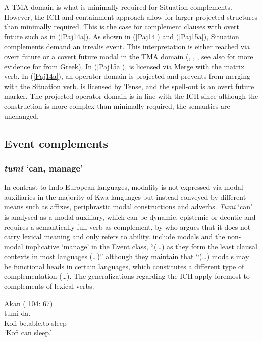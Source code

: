 \documentclass[output=paper]{langscibook}
\begin{document}
A TMA domain is what is minimally required for Situation complements. However, the ICH and containment approach allow for larger projected structures than minimally required. This is the case for complement clauses with overt future such as in (\ref{Paj14a}). As shown in (\ref{Paj14}) and (\ref{Paj15a}), Situation complements demand an irrealis event. This interpretation is either reached via overt future or a covert future modal  in the TMA domain (\citealt{todorovickwurmbrand2020}, \citealt{wurmbrand2014a}, \citealt{todorovic2015}, see also \citet{wurmbrandlohninger2020} for more evidence for  from Greek). In (\ref{Paj15a}),  is licensed via Merge with the matrix verb. In (\ref{Paj14a}), an operator domain is projected and prevents  from merging with the Situation verb.  is licensed by Tense, and the spell-out is an overt future marker. The projected operator domain is in line with the ICH since although the construction is more complex than minimally required, the semantics are unchanged.  

\subsection{Event complements}\label{Pajsect:3.3}

\subsubsection{\textit{tumi} `can, manage'}

In contrast to Indo-European languages, modality is not expressed via modal auxiliaries in the majority of Kwa languages but instead conveyed by different means such as affixes, periphrastic modal constructions and adverbs. \emph{Tumi} ‘can’ is analysed as a modal auxiliary, which can be dynamic, epistemic or deontic and requires a semantically full verb as complement, by \citet{owusu2014} who argues that it does not carry lexical meaning and only refers to ability. \citet{wurmbrandlohninger2020} include modals and the non-modal implicative ‘manage’ in the Event class, “(…) as they form the least clausal contexts in most languages (…)” although they maintain that “(…) modals may be functional heads in certain languages, which constitutes a different type of complementation (…). The generalizations regarding the ICH apply foremost to complements of lexical verbs.

\begin{exe}
\ex \label{Paj16} Akan (\citeauthor{owusu2014} 104: 67) \\ 
 {tumi} {da}.\\
    Kofi be.able.to sleep\\
\glt `Kofi can sleep.’\\
\end{exe}
\end{document}
